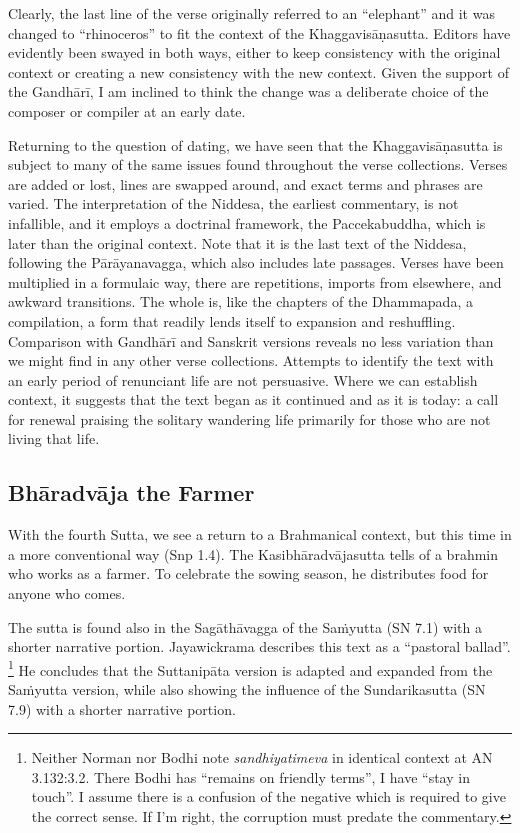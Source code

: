 \documentclass[12pt,openany]{book}%
\begin{document}
Clearly, the last line of the verse originally referred to an “elephant” and it was changed to “rhinoceros” to fit the context of the \textsanskrit{Khaggavisāṇasutta}. Editors have evidently been swayed in both ways, either to keep consistency with the original context or creating a new consistency with the new context. Given the support of the \textsanskrit{Gandhārī}, I am inclined to think the change was a deliberate choice of the composer or compiler at an early date.

Returning to the question of dating, we have seen that the \textsanskrit{Khaggavisāṇasutta} is subject to many of the same issues found throughout the verse collections. Verses are added or lost, lines are swapped around, and exact terms and phrases are varied. The interpretation of the Niddesa, the earliest commentary, is not infallible, and it employs a doctrinal framework, the Paccekabuddha, which is later than the original context. Note that it is the last text of the Niddesa, following the \textsanskrit{Pārāyanavagga}, which also includes late passages. Verses have been multiplied in a formulaic way, there are repetitions, imports from elsewhere, and awkward transitions. The whole is, like the chapters of the Dhammapada, a compilation, a form that readily lends itself to expansion and reshuffling. Comparison with \textsanskrit{Gandhārī} and Sanskrit versions reveals no less variation than we might find in any other verse collections. Attempts to identify the text with an early period of renunciant life are not persuasive. Where we can establish context, it suggests that the text began as it continued and as it is today: a call for renewal praising the solitary wandering life primarily for those who are not living that life.

\subsection*{\textsanskrit{Bhāradvāja} the Farmer}

With the fourth Sutta, we see a return to a Brahmanical context, but this time in a more conventional way (Snp 1.4). The \textsanskrit{Kasibhāradvājasutta} tells of a brahmin who works as a farmer. To celebrate the sowing season, he distributes food for anyone who comes.

The sutta is found also in the \textsanskrit{Sagāthāvagga} of the \textsanskrit{Saṁyutta} (SN 7.1) with a shorter narrative portion. Jayawickrama describes this text as a “pastoral ballad”. \footnote{Neither Norman nor Bodhi note \textit{sandhiyatimeva} in identical context at AN 3.132:3.2. There Bodhi has “remains on friendly terms”, I have “stay in touch”. I assume there is a confusion of the negative which is required to give the correct sense. If I’m right, the corruption must predate the commentary. } He concludes that the \textsanskrit{Suttanipāta} version is adapted and expanded from the \textsanskrit{Saṁyutta} version, while also showing the influence of the Sundarikasutta (SN 7.9) with a shorter narrative portion.
\end{document}
